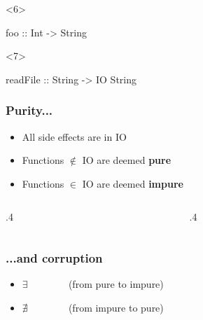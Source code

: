 \documentclass[17pt]{beamer}
\renewcommand{\(}[1]{\begin{columns}[#1]}
\renewcommand{\)}{\end{columns}}
\newcommand{\<}[1]{\begin{column}{#1}}
\renewcommand{\>}{\end{column}}
\begin{document}
\begin{frame}[fragile]
\begin{minipage}[c][.5\textheight]{\textwidth}
\begin{center}
\begin{onlyenv}
\begin{code}
      \end{code}
    \end{onlyenv}
    \begin{onlyenv}<6>
      \begin{code}
                  foo :: Int -> String
      \end{code}
    \end{onlyenv}
    \begin{onlyenv}<7>
      \begin{code}
            readFile :: String -> IO String
      \end{code}
    \end{onlyenv}
  \end{center}
  \end{minipage}
\end{frame}

\begin{frame}[fragile]
  \frametitle{Purity...}
  \begin{itemize}
  \item All side effects are in IO
  \item<2-> Functions $\not\in$ IO are deemed \textbf{pure}
  \item<3-> Functions $\in$ IO are deemed \textbf{impure}
  \end{itemize}

  \({c}
  \<{.4\textwidth}
  \begin{center}
  \end{center}
  \>
  \<{.4\textwidth}
  \begin{center}
  \end{center}
  \>
  \)
\end{frame}

\begin{frame}[fragile]
  \frametitle{...and corruption}
  \begin{itemize}
  \item $\exists$ ~~ ~~~~~{\small (from pure to impure)}
  \item $\nexists$ ~~ ~~~~~{\small (from impure to pure)}
  \end{itemize}

  \begin{center}
  \end{center}
\end{frame}
\end{document}

